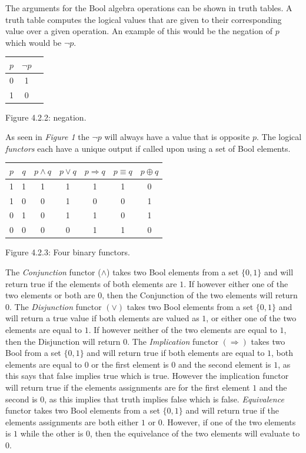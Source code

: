 \documentclass[11pt,a4paper]{report}
\begin{document}
The arguments for the Bool algebra operations can be shown in truth tables. A truth table computes the logical values that are given to their corresponding value over a given operation. An example of this would be the negation of $p$ which would be $\neg p$. 
\begin{center}
\begin{tabular}{|c|c|c|}
\hline
$p$ & $\neg p$\\ \hline
0 & 1 \\
1 & 0 \\ 
\hline
\end{tabular}  
\end{center}
\begin{center}
{Figure 4.2.2: negation.}
\end{center}
As seen in \emph{Figure 1} the $\neg p$ will always have a value that is opposite $p$.
The logical \emph{functors} each have a unique output if called upon using a set of Bool elements.
\begin{center}
\begin{tabular}{|c|c||c|c|c|c|c|}
\hline
$p$ & $q$ & $p \land q$ & $p \lor q$ & $p \Rightarrow q$ & $p \equiv q$ & $p \oplus q$		\\ \hline
1 & 1 & 1 & 1 & 1 & 1 & 0\\
1 & 0 & 0 & 1 & 0 & 0 & 1\\
0 & 1 & 0 & 1 & 1 & 0 & 1\\
0 & 0 & 0 & 0 & 1 & 1 & 0\\
\hline
\end{tabular}  
\end{center}
\begin{center}
{Figure 4.2.3: Four binary functors.}
\end{center}
The \emph{Conjunction} functor ($\land$) takes two Bool elements from a set $\{0,1\}$ and will return true if the elements of both elements are $1$. If however either one of the two elements or both are $0$, then the Conjunction of the two elements will return $0$. The \emph{Disjunction} functor $(\lor)$ takes two Bool elements from a set $\{0,1\}$ and will return a true value if both elements are valued as $1$, or either one of the two elements are equal to $1$. If however neither of the two elements are equal to $1$, then the Disjunction will return $0$. The \emph{Implication} functor $(\Rightarrow)$ takes two Bool from a set $\{0,1\}$ and will return true if both elements are equal to $1$, both elements are equal to $0$ or the first element is $0$ and the second element is $1$, as this says that false implies true which is true. However the implication functor will return true if the elements assignments are for the first element $1$ and the second is $0$, as this implies that truth implies false which is false. \emph{Equivalence} functor takes two Bool elements from a set $\{0,1\}$ and will return true if the elements assignments are both either $1$ or $0$. However, if one of the two elements is $1$ while the other is $0$, then the equivelance of the two elements will evaluate to $0$. 
\end{document}

